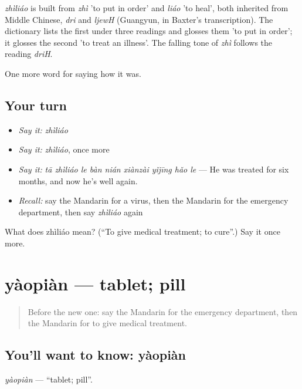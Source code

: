 \begin{cousinweb}
\emph{zhìliáo} is built from \emph{zhì} 'to put in order' and \emph{liáo} 'to heal', both inherited from Middle Chinese, \emph{dri} and \emph{ljewH} (Guangyun, in Baxter's transcription). The dictionary lists the first under three readings and glosses them 'to put in order'; it glosses the second 'to treat an illness'. The falling tone of \emph{zhì} follows the reading \emph{driH}.
\end{cousinweb}

\begin{grammarlens}[title={What you've built}]
One more word for saying how it was.
\end{grammarlens}

\subsection*{Your turn}
\begin{itemize}
\raggedright
  \item \emph{Say it:} \emph{zhìliáo}
  \item \emph{Say it:} \emph{zhìliáo}, once more
  \item \emph{Say it:} \emph{tā zhìliáo le bàn nián xiànzài yǐjīng hǎo le} — He was treated for six months, and now he's well again.
  \item \emph{Recall:} say the Mandarin for a virus, then the Mandarin for the emergency department, then say \emph{zhìliáo} again
\end{itemize}

\begin{tcolorbox}[breakable,colback=teal!4,colframe=teal!35!black,title={Before you move on}]
What does zhìliáo mean? (\textquotedblleft{}To give medical treatment; to cure\textquotedblright{}.) Say it once more.
\end{tcolorbox}
\section[yàopiàn]{yàopiàn — tablet; pill}

\label{lesson:ZH-C482-yaopian}



\begin{quote}
Before the new one: say the Mandarin for the emergency department, then the Mandarin for to give medical treatment.
\end{quote}

\subsection*{You'll want to know: yàopiàn}
\emph{yàopiàn} — \textquotedblleft{}tablet; pill\textquotedblright{}.

